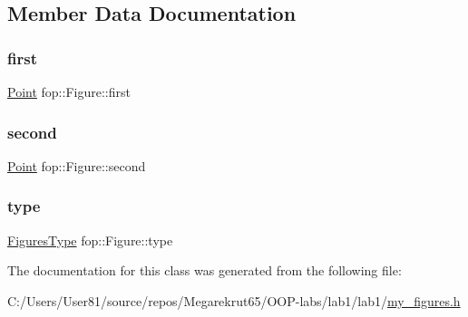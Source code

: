 \subsection{Member Data Documentation}
\mbox{\label{classfop_1_1_figure_afac8422d33b66489e3a7ddda4751d219}} 
\subsubsection{\texorpdfstring{first}{first}}
{\footnotesize\ttfamily \mbox{\hyperlink{structtdp_1_1_point}{Point}} fop\+::\+Figure\+::first}

\mbox{\label{classfop_1_1_figure_a10aa53d6dcfa427b06ebcf93ae6075b9}} 
\subsubsection{\texorpdfstring{second}{second}}
{\footnotesize\ttfamily \mbox{\hyperlink{structtdp_1_1_point}{Point}} fop\+::\+Figure\+::second}

\mbox{\label{classfop_1_1_figure_ab3800215a1229d637bae3c24cfc59e08}} 
\subsubsection{\texorpdfstring{type}{type}}
{\footnotesize\ttfamily \mbox{\hyperlink{namespacefop_a60dafe2e1ac5bb402dad57ecacde23d5}{Figures\+Type}} fop\+::\+Figure\+::type}



The documentation for this class was generated from the following file\+:\begin{DoxyCompactItemize}
\item 
C\+:/\+Users/\+User81/source/repos/\+Megarekrut65/\+O\+O\+P-\/labs/lab1/lab1/\mbox{\hyperlink{my__figures_8h}{my\+\_\+figures.\+h}}\end{DoxyCompactItemize}

